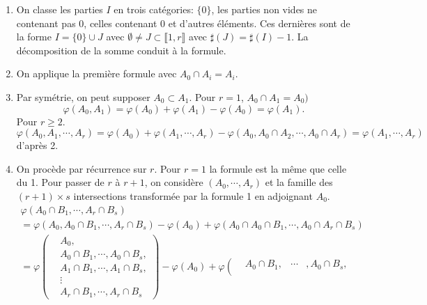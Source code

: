 \begin{demo}
  \begin{enumerate}
    \item On classe les parties $I$ en trois catégories: $\{ 0 \}$, les parties non vides ne contenant pas $0$, celles contenant $0$ et d'autres éléments. Ces dernières sont de la forme $I = \{ 0 \}\cup J$ avec $\emptyset \neq J \subset \llbracket 1, r \rrbracket$ avec $\sharp(J) = \sharp(I) -1$. La décomposition de la somme conduit à la formule.
    \item On applique la première formule avec $A_0 \cap A_i = A_i$.
    \item Par symétrie, on peut supposer $A_0 \subset A_1$. Pour $r = 1$, $A_0 \cap A_1 = A_0)$
    \begin{displaymath}
      \varphi(A_0, A_1) = \varphi(A_0) + \varphi(A_1) - \varphi(A_0) = \varphi(A_1).
    \end{displaymath}
    Pour $r\geq 2$.
    \begin{displaymath}
      \varphi(A_0,A_1, \cdots,A_r) = \varphi(A_0) + \varphi(A_1, \cdots,A_r) - \varphi(A_0,A_0 \cap A_2, \cdots , A_0\cap A_r) = \varphi(A_1, \cdots,A_r)
    \end{displaymath}
    d'après 2.
    \item On procède par récurrence sur $r$. Pour $r=1$ la formule est la même que celle du 1.\newline
    Pour passer de $r$ à $r+1$, on considère $(A_0, \cdots,A_r)$ et la famille des $(r+1)\times s$ intersections transformée par la formule 1 en adjoignant $A_0$.
    \begin{multline*}
      \varphi(A_0\cap B_1, \cdots, A_r \cap B_s) \\
      = \varphi(A_0, A_0\cap B_1, \cdots, A_r \cap B_s) -\varphi(A_0) + \varphi(A_0\cap A_0\cap B_1, \cdots, A_0\cap A_r \cap B_s)\\
      = \varphi \left(
      \begin{aligned}
      &A_0, \\
      &A_0 \cap B_1, \cdots, A_0\cap B_s, \\
      &A_1 \cap B_1, \cdots, A_1\cap B_s, \\
      & \vdots  \\
      &A_r \cap B_1, \cdots, A_r\cap B_s
      \end{aligned}
      \right)
      -\varphi(A_0)
      + \varphi \left(
      \begin{aligned}
        & A_0\cap B_1, &\cdots &, A_0 \cap B_s, \\

\end{aligned}
\end{multline*}
\end{enumerate}
\end{demo}
